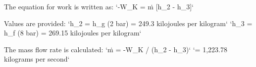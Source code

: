 The equation for work is written as:  
`-W_K = ṁ [h_2 - h_3]`  

Values are provided:  
`h_2 = h_g (2 bar) = 249.3 kilojoules per kilogram`  
`h_3 = h_f (8 bar) = 269.15 kilojoules per kilogram`  

The mass flow rate is calculated:  
`ṁ = -W_K / (h_2 - h_3)`  
`= 1,223.78 kilograms per second`